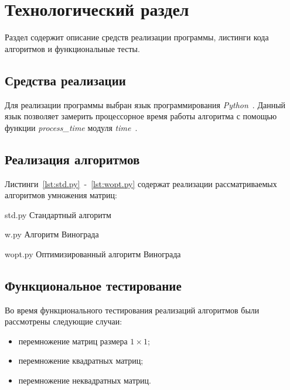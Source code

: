 \chapter{Технологический раздел}

Раздел содержит описание средств реализации программы, листинги кода алгоритмов и функциональные тесты.

\section{Средства реализации}

Для реализации программы выбран язык программирования \textit{Python}~\cite{pydoc}. Данный язык позволяет замерить процессорное время работы алгоритма с помощью функции \textit{process\_time} модуля \textit{time}~\cite{pytimedoc}.

\section{Реализация алгоритмов}

Листинги~\ref{lst:std.py}~-~\ref{lst:wopt.py} содержат реализации рассматриваемых алгоритмов умножения матриц:

{std.py} %
{Стандартный алгоритм} %

\clearpage

{w.py} %
{Алгоритм Винограда} %

\clearpage

{wopt.py} %
{Оптимизированный алгоритм Винограда} %

\clearpage

\section{Функциональное тестирование}

Во время функционального тестирования реализаций алгоритмов были рассмотрены следующие случаи:
\begin{itemize}[label=--]
    \item перемножение матриц размера $1 \times 1$;
    \item перемножение квадратных матриц;
    \item перемножение неквадратных матриц.
\end{itemize}

